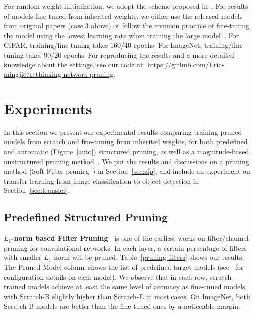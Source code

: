 For random weight initialization, we adopt the scheme proposed in~\cite{he2015delving}. For results of models fine-tuned from inherited weights, we either use the released models from original papers (case 3 above) or follow the common practice of fine-tuning the model using the lowest learning rate when training the large model~\cite{li2016pruning, he2017channel}. For CIFAR, training/fine-tuning takes 160/40 epochs. For ImageNet, training/fine-tuning takes 90/20 epochs. For reproducing the results and a more detailed knowledge about the settings, see our code at: \url{https://github.com/Eric-mingjie/rethinking-network-pruning}.

\section{Experiments}
\label{sec:exp}
In this section we present our experimental results comparing training pruned models from scratch and fine-tuning from inherited weights, for both predefined and automatic (Figure~\ref{auto}) structured pruning, as well as a magnitude-based unstructured pruning method~\cite{han2015learning}. We put the results and discussions on a pruning method (Soft Filter pruning~\cite{he2018sfp}) in Section~\ref{sec:sfp}, and include an experiment on transfer learning from image classification to object detection in Section~\ref{sec:transfer}.


\subsection{Predefined Structured Pruning}
\textbf{$L_1$-norm based Filter Pruning~\cite{li2016pruning}} is one of the earliest works on filter/channel pruning for convolutional networks. In each layer, a certain percentage of filters with smaller $L_1$-norm will be pruned. 
Table~\ref{pruning-filters} shows our results. The Pruned Model column shows the list of predefined target models (see~\cite{li2016pruning} for configuration details on each model). We observe that in each row, scratch-trained models achieve at least the same level of accuracy as fine-tuned models, with Scratch-B slightly higher than Scratch-E in most cases. On ImageNet, both Scratch-B models are better than the fine-tuned ones by a noticeable margin. 

